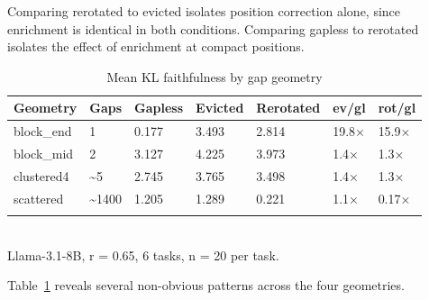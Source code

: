 \documentclass[10pt,letterpaper]{article}
\begin{document}
Comparing rerotated to evicted isolates position correction alone, since
enrichment is identical in both conditions. Comparing gapless to
rerotated isolates the effect of enrichment at compact positions.
\begin{table}[H]
\centering
\small
\caption{Mean KL faithfulness by gap geometry}
\label{tab:t2}
\begin{tabular}{@{}lllllll@{}}
\toprule
Geometry & Gaps & Gapless & Evicted & Rerotated & ev/gl & rot/gl\\
\midrule
block\_end & 1 & 0.177 & 3.493 & 2.814 & 19.8× & 15.9×\\
block\_mid & 2 & 3.127 & 4.225 & 3.973 & 1.4× & 1.3×\\
clustered4 & \textasciitilde5 & 2.745 & 3.765 & 3.498 & 1.4× & 1.3×\\
scattered & \textasciitilde1400 & 1.205 & 1.289 & 0.221 & 1.1× & 0.17×\\
\bottomrule
\\
\end{tabular}
\\Llama-3.1-8B, r = 0.65, 6 tasks, n = 20 per task.
\end{table}

Table~\ref{tab:t2} reveals several non-obvious patterns across the four geometries.
\end{document}
